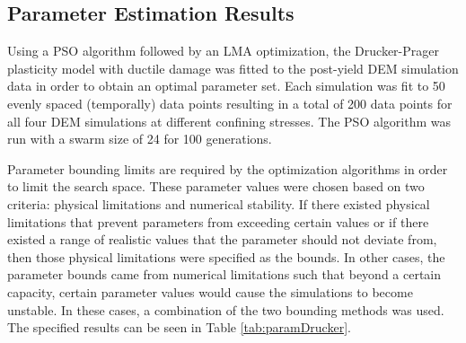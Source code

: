 \subsection{Parameter Estimation Results}

Using a PSO algorithm followed by an LMA optimization, the Drucker-Prager plasticity model with ductile damage was fitted to the post-yield DEM simulation data in order to obtain an optimal parameter set. Each simulation was fit to 50 evenly spaced (temporally) data points resulting in a total of 200 data points for all four DEM simulations at different confining stresses. The PSO algorithm was run with a swarm size of 24 for 100 generations.

Parameter bounding limits are required by the optimization algorithms in order to limit the search space. These parameter values were chosen based on two criteria: physical limitations and numerical stability. If there existed physical limitations that prevent parameters from exceeding certain values or if there existed a range of realistic values that the parameter should not deviate from, then those physical limitations were specified as the bounds. In other cases, the parameter bounds came from numerical limitations such that beyond a certain capacity, certain parameter values would cause the simulations to become unstable. In these cases, a combination of the two bounding methods was used.  The specified results can be seen in Table \ref{tab:paramDrucker}.

